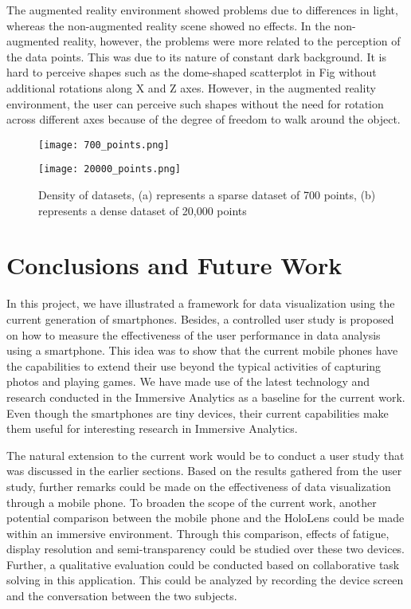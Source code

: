 \documentclass[journal]{vgtc}                %
\begin{document}
The augmented reality environment showed problems due to differences in light, whereas the non-augmented reality scene showed no effects. In the non-augmented reality, however, the problems were more related to the perception of the data points. This was due to its nature of constant dark background. It is hard to perceive shapes such as the dome-shaped scatterplot in Fig without additional rotations along X and Z axes. However, in the augmented reality environment, the user can perceive such shapes without the need for rotation across different axes because of the degree of freedom to walk around the object.

\begin{figure}[ht]
    \begin{minipage}[b]{0.45\linewidth}
        \centering
        \texttt{[image: 700\_points.png]}
        \subcaption{}
    \end{minipage}
    \hspace{0.5cm}
    \begin{minipage}[b]{0.45\linewidth}
        \centering
        \texttt{[image: 20000\_points.png]}
      \subcaption{}
    \end{minipage}
    \caption{Density of datasets, (a) represents a sparse dataset of 700 points, (b) represents a dense dataset of 20,000 points}
\end{figure}

\section{Conclusions and Future Work}
In this project, we have illustrated a framework for data visualization using the current generation of smartphones. Besides, a controlled user study is proposed on how to measure the effectiveness of the user performance in data analysis using a smartphone. This idea was to show that the current mobile phones have the capabilities to extend their use beyond the typical activities of capturing photos and playing games. We have made use of the latest technology and research conducted in the Immersive Analytics as a baseline for the current work. Even though the smartphones are tiny devices, their current capabilities make them useful for interesting research in Immersive Analytics.

The natural extension to the current work would be to conduct a user study that was discussed in the earlier sections. Based on the results gathered from the user study, further remarks could be made on the effectiveness of data visualization through a mobile phone. To broaden the scope of the current work, another potential comparison between the mobile phone and the HoloLens could be made within an immersive environment. Through this comparison, effects of fatigue, display resolution and semi-transparency could be studied over these two devices. Further, a qualitative evaluation\cite{Preim} could be conducted based on collaborative task solving in this application. This could be analyzed by recording the device screen and the conversation between the two subjects.
\end{document}
